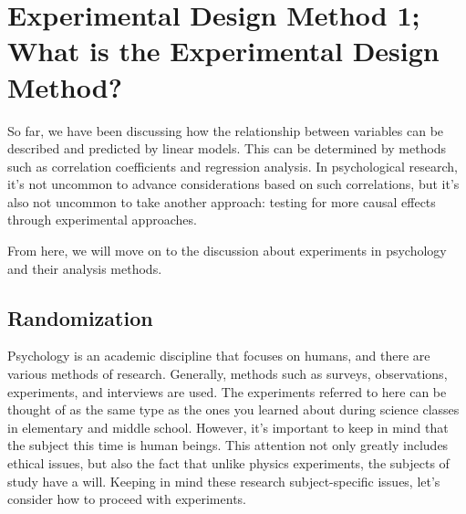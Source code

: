 \documentclass{ltjbook}
\begin{document}
\chapter{Experimental Design Method 1; What is the Experimental Design Method?}
\label{m12_design1}

So far, we have been discussing how the relationship between variables can be described and predicted by linear models. This can be determined by methods such as correlation coefficients and regression analysis. In psychological research, it's not uncommon to advance considerations based on such correlations, but it's also not uncommon to take another approach: testing for more causal effects through experimental approaches.

From here, we will move on to the discussion about experiments in psychology and their analysis methods.


\section{Randomization}
\label{RCT}
Psychology is an academic discipline that focuses on humans, and there are various methods of research. Generally, methods such as surveys, observations, experiments, and interviews are used. The experiments referred to here can be thought of as the same type as the ones you learned about during science classes in elementary and middle school. However, it's important to keep in mind that the subject this time is human beings. This attention not only greatly includes ethical issues, but also the fact that unlike physics experiments, the subjects of study have a will. Keeping in mind these research subject-specific issues, let's consider how to proceed with experiments.
\end{document}
